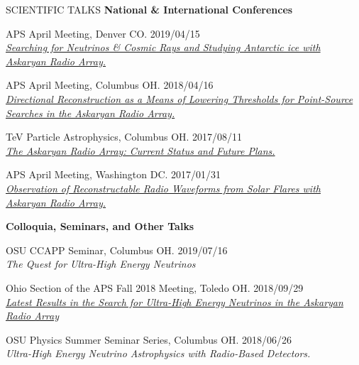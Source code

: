 \documentclass{resume} %
\begin{document}

\begin{rSection}{SCIENTIFIC TALKS}
{\bf National \& International Conferences}
\begin{etaremune}
\item APS April Meeting, Denver CO. \hfill 2019/04/15 \\
\href{http://meetings.aps.org/Meeting/APR19/Session/R08.4}{{\em Searching for Neutrinos \& Cosmic Rays and Studying Antarctic ice with Askaryan Radio Array.}}

\item APS April Meeting, Columbus OH. \hfill 2018/04/16 \\
\href{http://meetings.aps.org/Meeting/APR18/Session/U17.7}{{\em Directional Reconstruction as a Means of Lowering Thresholds for Point-Source Searches in the Askaryan Radio Array.}}

\item TeV Particle Astrophysics, Columbus OH. \hfill 2017/08/11 \\
\href{http://indico.cern.ch/event/615891/contributions/2648790/}{{\em The Askaryan Radio Array: Current Status and Future Plans.} }

\item APS April Meeting, Washington DC. \hfill 2017/01/31 \\
\href{http://meetings.aps.org/Meeting/APR17/Session/Y3.2}{{\em Observation of Reconstructable Radio Waveforms from Solar Flares with Askaryan Radio Array.}}
\end{etaremune}

{\bf Colloquia, Seminars, and Other Talks}
\begin{etaremune}

\item OSU CCAPP Seminar, Columbus OH. \hfill 2019/07/16 \\
\textit{The Quest for Ultra-High Energy Neutrinos}

\item Ohio Section of the APS Fall 2018 Meeting, Toledo OH. \hfill 2018/09/29 \\
\href{http://meetings.aps.org/Meeting/OSF18/Session/A01.2}{\em Latest Results in the Search for Ultra-High Energy Neutrinos in the Askaryan Radio Array} 

\item OSU Physics Summer Seminar Series, Columbus OH. \hfill 2018/06/26 \\
{\em Ultra-High Energy Neutrino Astrophysics with Radio-Based Detectors.} 


\end{etaremune}
\end{rSection}
\end{document}
